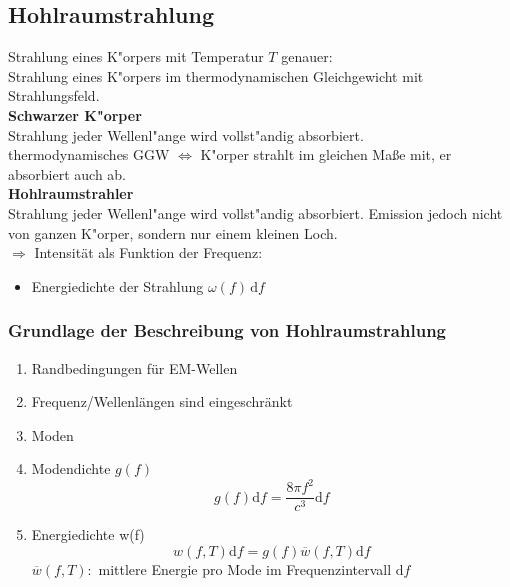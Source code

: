\documentclass[titlepage,11pt,a4paper,ngerman]{report}
\newcommand{\tx}[1]{\textrm{#1}}
\newcommand{\ol}[1]{\overline{#1}}
\newcommand{\dd}{\tx{d}}
\begin{document}

\subsection{Hohlraumstrahlung}  %

Strahlung eines K"orpers mit Temperatur $T$ genauer:\\[5pt]
Strahlung eines K"orpers im thermodynamischen Gleichgewicht mit Strahlungsfeld.\\[5pt]
\textbf{Schwarzer K"orper}\\
Strahlung jeder Wellenl"ange wird vollst"andig absorbiert.\\
thermodynamisches GGW $\Leftrightarrow$ K"orper strahlt im gleichen Maße mit, er absorbiert auch ab.\\[5pt]
\textbf{Hohlraumstrahler}\\
Strahlung jeder Wellenl"ange wird vollst"andig absorbiert. Emission jedoch nicht von ganzen K"orper, sondern nur einem kleinen Loch.\\[5pt]
$ \Rightarrow $ Intensität als Funktion der Frequenz:
\begin{itemize}
	\item Energiedichte der Strahlung $ \omega(f) \, \dd f $
\end{itemize}

\subsubsection{Grundlage der Beschreibung von Hohlraumstrahlung}


\noindent
\begin{enumerate}[$ \Rightarrow $]
	\item Randbedingungen für EM-Wellen
	\item Frequenz/Wellenlängen sind eingeschränkt
	\item Moden
	\item Modendichte $ g(f) $
	\begin{equation*}
	g(f) \dd f = \frac{ 8 \pi f^2 }{c^3} \dd f
	\end{equation*}
	\item Energiedichte w(f)
	\begin{equation*}
	w(f,T) \dd f = g(f) \ol{w}(f,T) \dd f
	\end{equation*}
	$ \ol{w}(f,T) : $ mittlere Energie pro Mode im Frequenzintervall $ \dd f $
\end{enumerate}
\end{document}
